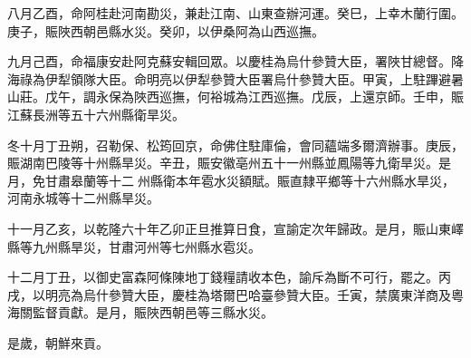 \begin{pinyinscope}
八月乙酉，命阿桂赴河南勘災，兼赴江南、山東查辦河運。癸巳，上幸木蘭行圍。庚子，賑陜西朝邑縣水災。癸卯，以伊桑阿為山西巡撫。

九月己酉，命福康安赴阿克蘇安輯回眾。以慶桂為烏什參贊大臣，署陜甘總督。降海祿為伊犁領隊大臣。命明亮以伊犁參贊大臣署烏什參贊大臣。甲寅，上駐蹕避暑山莊。戊午，調永保為陜西巡撫，何裕城為江西巡撫。戊辰，上還京師。壬申，賑江蘇長洲等五十六州縣衛旱災。

冬十月丁丑朔，召勒保、松筠回京，命佛住駐庫倫，會同蘊端多爾濟辦事。庚辰，賑湖南巴陵等十州縣旱災。辛丑，賑安徽亳州五十一州縣並鳳陽等九衛旱災。是月，免甘肅皋蘭等十二州縣衛本年雹水災額賦。賑直隸平鄉等十六州縣水旱災，河南永城等十二州縣旱災。

十一月乙亥，以乾隆六十年乙卯正旦推算日食，宣諭定次年歸政。是月，賑山東嶧縣等九州縣旱災，甘肅河州等七州縣水雹災。

十二月丁丑，以御史富森阿條陳地丁錢糧請收本色，諭斥為斷不可行，罷之。丙戌，以明亮為烏什參贊大臣，慶桂為塔爾巴哈臺參贊大臣。壬寅，禁廣東洋商及粵海關監督貢獻。是月，賑陜西朝邑等三縣水災。

是歲，朝鮮來貢。


\end{pinyinscope}